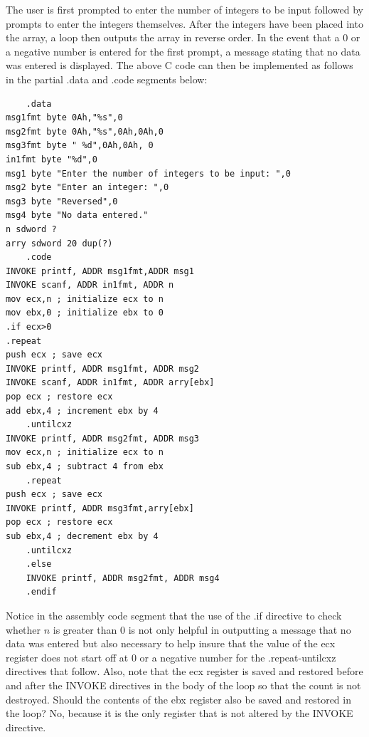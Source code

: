 \documentclass[10pt]{book}
\begin{document}
The user is first prompted to enter the number of integers to be input followed by prompts to enter the integers themselves. After the integers have been placed into the array, a loop then outputs the array in reverse order. In the event that a 0 or a negative number is entered for the first prompt, a message stating that no data was entered is displayed. The above C code can then be implemented as follows in the partial .data and .code segments below:
\begin{verbatim}
    .data
msg1fmt byte 0Ah,"%s",0
msg2fmt byte 0Ah,"%s",0Ah,0Ah,0
msg3fmt byte " %d",0Ah,0Ah, 0
in1fmt byte "%d",0
msg1 byte "Enter the number of integers to be input: ",0
msg2 byte "Enter an integer: ",0
msg3 byte "Reversed",0
msg4 byte "No data entered."
n sdword ?
arry sdword 20 dup(?)
    .code
INVOKE printf, ADDR msg1fmt,ADDR msg1
INVOKE scanf, ADDR in1fmt, ADDR n
mov ecx,n ; initialize ecx to n
mov ebx,0 ; initialize ebx to 0
.if ecx>0
.repeat
push ecx ; save ecx
INVOKE printf, ADDR msg1fmt, ADDR msg2
INVOKE scanf, ADDR in1fmt, ADDR arry[ebx]
pop ecx ; restore ecx
add ebx,4 ; increment ebx by 4
    .untilcxz
INVOKE printf, ADDR msg2fmt, ADDR msg3
mov ecx,n ; initialize ecx to n
sub ebx,4 ; subtract 4 from ebx
    .repeat
push ecx ; save ecx
INVOKE printf, ADDR msg3fmt,arry[ebx]
pop ecx ; restore ecx
sub ebx,4 ; decrement ebx by 4
    .untilcxz
    .else
    INVOKE printf, ADDR msg2fmt, ADDR msg4
    .endif
\end{verbatim}

Notice in the assembly code segment that the use of the .if directive to check whether $n$ is greater than 0 is not only helpful in outputting a message that no data was entered but also necessary to help insure that the value of the ecx register does not start off at 0 or a negative number for the .repeat-untilcxz directives that follow. Also, note that the ecx register is saved and restored before and after the INVOKE directives in the body of the loop so that the count is not destroyed. Should the contents of the ebx register also be saved and restored in the loop? No, because it is the only register that is not altered by the INVOKE directive.
\end{document}
